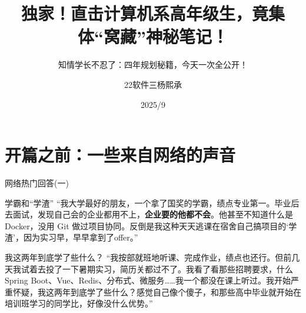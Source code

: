 \documentclass{beamer}
\title{独家！直击计算机系高年级生，竟集体“窝藏”神秘笔记！}
\subtitle{知情学长不忍了：四年规划秘籍，今天一次全公开！}
\author{22软件三杨熙承}
\date{2025/9}
\newcommand{\hrefcol}[2]{\textcolor{cyan}{\href{#1}{#2}}}
\begin{document}
\maketitle












\section*{开篇之前：一些来自网络的声音}

\begin{frame}{网络热门回答(一)}
    \begin{block}{学霸和“学渣”}
    “我大学最好的朋友，一个拿了国奖的学霸，绩点专业第一。毕业后去面试，发现自己会的企业都用不上，\textbf{企业要的他都不会}。他甚至不知道什么是 Docker，没用 Git 做过项目协同。反倒是我这种天天逃课在宿舍自己搞项目的‘学渣’，因为实习早，早早拿到了offer。”
    \end{block}
    \begin{block}{我这两年到底学了些什么？}
    “我按部就班地听课、完成作业，绩点也还行。但前几天我试着去投了一下暑期实习，简历关都过不了。我看了看那些招聘要求，什么Spring Boot、Vue、Redis、分布式、微服务……我一个都没在课上听过。我开始严重怀疑，我这两年到底学了些什么？感觉自己像个傻子，和那些高中毕业就开始在培训班学习的同学比，好像没什么优势。”
    \end{block}
\end{frame}
\end{document}
